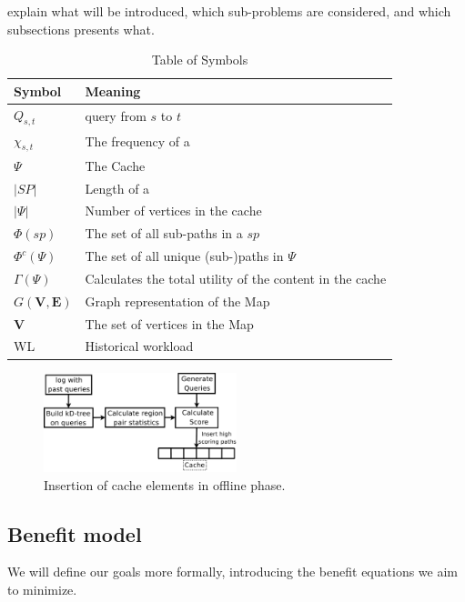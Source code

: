 explain what will be introduced, which sub-problems are considered, and which subsections presents what.


\begin{table}
\begin{tabular*}{\columnwidth}{|l|p{}|}
\hline
\bf Symbol		& \bf Meaning \\\hline
$Q_{s,t}$		& \spath query from $s$ to $t$ \\\hline
$\chi_{s,t}$		& The frequency of a \spath \\\hline
$\Psi$ 			& The Cache \\\hline
$|SP|$			& Length of a \spath \\\hline
$|\Psi|$		& Number of vertices in the cache \\\hline
$\Phi(sp)$		& The set of all sub-paths in a \spath $sp$ \\\hline
$\Phi^c(\Psi)$		& The set of all unique (sub-)paths in $\Psi$ \\\hline
$\Gamma(\Psi)$		& Calculates the total utility of the content in the cache \\\hline 
$G\mathbf{(V,E)}$ 	& Graph representation of the Map \\\hline 
$\mathbf{V}$ 		& The set of vertices in the Map \\\hline 
WL			& Historical workload \\\hline
\end{tabular*}
\caption{Table of Symbols}
\label{tab:symbols}
\end{table}


\begin{figure}[bht]
  \center
        \includegraphics[width=0.5\textwidth]{figures/fillcache}
        \caption{Insertion of cache elements in offline phase.}
  \label{fig:fillcache}
\end{figure}


\subsection{Benefit model}

We will define our goals more formally, introducing the benefit equations we aim to minimize.

